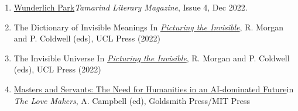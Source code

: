 \vspace{\baselineskip}
\begin{enumerate}

\item
{}
{\href{https://tamarindlit.co.uk/2022/12/23/issue-4/}{Wunderlich Park}}{{\em Tamarind Literary Magazine}, Issue 4, Dec 2022}.


\item {}
{The Dictionary of Invisible Meanings}
{In {\em \href{https://www.uclpress.co.uk/collections/ro_homepage_products/products/178924}{Picturing the Invisible}}, R. Morgan and P. Coldwell (eds), UCL Press (2022)}

\item 
{}
{The Invisible Universe}
{In {\em \href{https://www.uclpress.co.uk/collections/ro_homepage_products/products/178924}{Picturing the Invisible}}, R. Morgan and P. Coldwell (eds), UCL Press (2022)}

\item 
{}
{\href{https://mitpress.mit.edu/books/love-makers}{Masters and Servants: The Need for Humanities in an AI-dominated Future}}{in {\em The Love Makers}, A. Campbell (ed), Goldsmith Press/MIT Press}
\end{enumerate}
\setcounter{nPEBookChapters}{\value{enumi}}

\vspace{\baselineskip}

